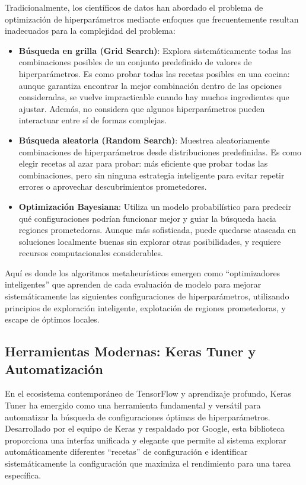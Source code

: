 Tradicionalmente, los científicos de datos han abordado el problema de optimización de hiperparámetros mediante enfoques que frecuentemente resultan inadecuados para la complejidad del problema:

\begin{itemize}
    \item \textbf{Búsqueda en grilla (Grid Search)}: Explora sistemáticamente todas las combinaciones posibles de un conjunto predefinido de valores de hiperparámetros. Es como probar todas las recetas posibles en una cocina: aunque garantiza encontrar la mejor combinación dentro de las opciones consideradas, se vuelve impracticable cuando hay muchos ingredientes que ajustar. Además, no considera que algunos hiperparámetros pueden interactuar entre sí de formas complejas.
    \item \textbf{Búsqueda aleatoria (Random Search)}: Muestrea aleatoriamente combinaciones de hiperparámetros desde distribuciones predefinidas. Es como elegir recetas al azar para probar: más eficiente que probar todas las combinaciones, pero sin ninguna estrategia inteligente para evitar repetir errores o aprovechar descubrimientos prometedores.
    \item \textbf{Optimización Bayesiana}: Utiliza un modelo probabilístico para predecir qué configuraciones podrían funcionar mejor y guiar la búsqueda hacia regiones prometedoras. Aunque más sofisticada, puede quedarse atascada en soluciones localmente buenas sin explorar otras posibilidades, y requiere recursos computacionales considerables.
\end{itemize}

Aquí es donde los algoritmos metaheurísticos emergen como ``optimizadores inteligentes'' que aprenden de cada evaluación de modelo para mejorar sistemáticamente las siguientes configuraciones de hiperparámetros, utilizando principios de exploración inteligente, explotación de regiones prometedoras, y escape de óptimos locales.

\subsection{Herramientas Modernas: Keras Tuner y Automatización}

En el ecosistema contemporáneo de TensorFlow y aprendizaje profundo, Keras Tuner \cite{omalley2020hyperparameter} ha emergido como una herramienta fundamental y versátil para automatizar la búsqueda de configuraciones óptimas de hiperparámetros. Desarrollado por el equipo de Keras y respaldado por Google, esta biblioteca proporciona una interfaz unificada y elegante que permite al sistema explorar automáticamente diferentes ``recetas'' de configuración e identificar sistemáticamente la configuración que maximiza el rendimiento para una tarea específica.

